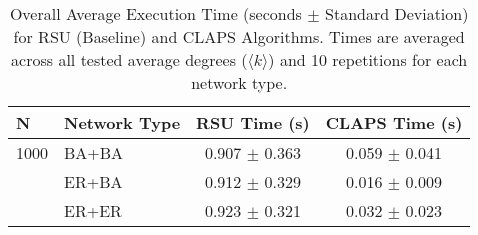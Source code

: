 \begin{table}[htbp]
\centering
\caption{Overall Average Execution Time (seconds $\pm$ Standard Deviation) for RSU (Baseline) and CLAPS Algorithms. Times are averaged across all tested average degrees ($\langle k \rangle$) and 10 repetitions for each network type.}
\label{tab:execution_time_overall}
\begin{tabular}{l l c c}
\toprule
N & Network Type & RSU Time (s) & CLAPS Time (s) \\
\midrule
1000 & BA+BA & 0.907 $\pm$ 0.363 & 0.059 $\pm$ 0.041 \\
 & ER+BA & 0.912 $\pm$ 0.329 & 0.016 $\pm$ 0.009 \\
 & ER+ER & 0.923 $\pm$ 0.321 & 0.032 $\pm$ 0.023 \\
\bottomrule
\end{tabular}%
\end{table}
